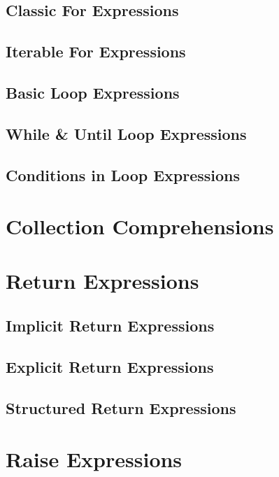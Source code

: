 \subsection{Classic For Expressions}

\subsection{Iterable For Expressions}

\subsection{Basic Loop Expressions}

\subsection{While \& Until Loop Expressions}

\subsection{Conditions in Loop Expressions}

\section{Collection Comprehensions}

\section{Return Expressions}

\subsection{Implicit Return Expressions}

\subsection{Explicit Return Expressions}

\subsection{Structured Return Expressions}

\section{Raise Expressions}

